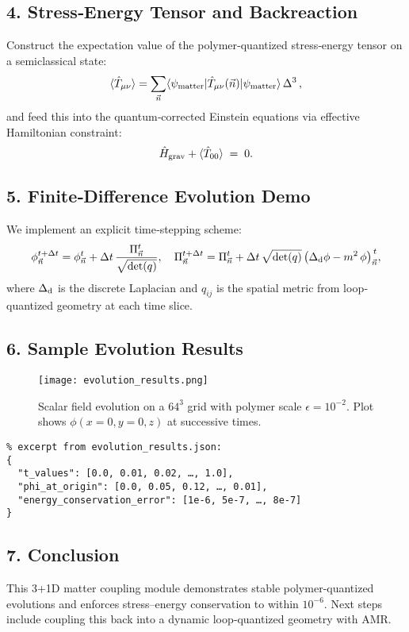 \documentclass[12pt]{article}
\begin{document}
\subsection*{4. Stress‐Energy Tensor and Backreaction}
Construct the expectation value of the polymer‐quantized stress‐energy tensor on a semiclassical state:
\[
  \langle \hat{T}_{\mu\nu} \rangle 
  = \sum_{\vec{n}} \langle \psi_{\rm matter} | \hat{T}_{\mu\nu}(\vec{n}) | \psi_{\rm matter} \rangle \,\Delta^3\,,
\]
and feed this into the quantum‐corrected Einstein equations via effective Hamiltonian constraint:
\[
  \hat{H}_{\rm grav} + \langle \hat{T}_{00}\rangle \;=\; 0.
\]

\subsection*{5. Finite‐Difference Evolution Demo}
We implement an explicit time‐stepping scheme:
\[
  \phi_{\vec{n}}^{t+\Delta t} = \phi_{\vec{n}}^{t} + \Delta t\,\frac{\Pi_{\vec{n}}^t}{\sqrt{\det(q)}}, 
  \quad 
  \Pi_{\vec{n}}^{t+\Delta t} = \Pi_{\vec{n}}^{t} + \Delta t\,\sqrt{\det(q)}\,\bigl(\Delta_{\rm d}\phi - m^2\,\phi\bigr)_{\vec{n}}^{\,t},
\]
where $\Delta_{\rm d}$ is the discrete Laplacian and $q_{ij}$ is the spatial metric from loop‐quantized geometry at each time slice.

\subsection*{6. Sample Evolution Results}
\begin{figure}[h]
  \centering
  \texttt{[image: evolution\_results.png]}
  \caption{Scalar field evolution on a $64^3$ grid with polymer scale $\epsilon=10^{-2}$.  Plot shows $\phi(x=0,y=0,z)$ at successive times.}
\end{figure}

\begin{verbatim}
% excerpt from evolution_results.json:
{
  "t_values": [0.0, 0.01, 0.02, …, 1.0],
  "phi_at_origin": [0.0, 0.05, 0.12, …, 0.01],
  "energy_conservation_error": [1e-6, 5e-7, …, 8e-7]
}
\end{verbatim}

\subsection*{7. Conclusion}
This 3+1D matter coupling module demonstrates stable polymer‐quantized evolutions and enforces stress–energy conservation to within $10^{-6}$.  Next steps include coupling this back into a dynamic loop‐quantized geometry with AMR.
\end{document}
